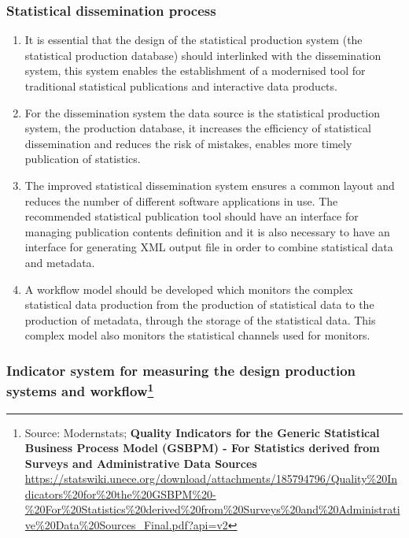 \documentclass[
]{article}
\begin{document}
\hypertarget{statistical-dissemination-process}{%
\subsubsection{Statistical dissemination process}\label{statistical-dissemination-process}}

\begin{enumerate}
\def\labelenumi{\arabic{enumi}.}
\setcounter{enumi}{281}
\item
  It is essential that the design of the statistical production
  system (the statistical production database) should interlinked with
  the dissemination system, this system enables the establishment of a
  modernised tool for traditional statistical publications and
  interactive data products.
\item
  For the dissemination system the data source is the statistical
  production system, the production database, it increases the
  efficiency of statistical dissemination and reduces the risk of
  mistakes, enables more timely publication of statistics.
\item
  The improved statistical dissemination system ensures a common
  layout and reduces the number of different software applications in
  use. The recommended statistical publication tool should have an
  interface for managing publication contents definition and it is
  also necessary to have an interface for generating XML output file
  in order to combine statistical data and metadata.
\item
  A workflow model should be developed which monitors the complex
  statistical data production from the production of statistical data
  to the production of metadata, through the storage of the
  statistical data. This complex model also monitors the statistical
  channels used for monitors.
\end{enumerate}

\hypertarget{indicator-system-for-measuring-the-design-production-systems-and-workflow}{%
\subsubsection[Indicator system for measuring the design production systems and workflow]{\texorpdfstring{Indicator system for measuring the design production systems and workflow\footnote{Source: Modernstats; \textbf{Quality Indicators for the Generic
  Statistical Business Process Model (GSBPM) - For Statistics derived
  from Surveys and Administrative Data Sources}
  \url{https://statswiki.unece.org/download/attachments/185794796/Quality\%20Indicators\%20for\%20the\%20GSBPM\%20-\%20For\%20Statistics\%20derived\%20from\%20Surveys\%20and\%20Administrative\%20Data\%20Sources_Final.pdf?api=v2}}}{Indicator system for measuring the design production systems and workflow}}\label{indicator-system-for-measuring-the-design-production-systems-and-workflow}}
\end{document}

